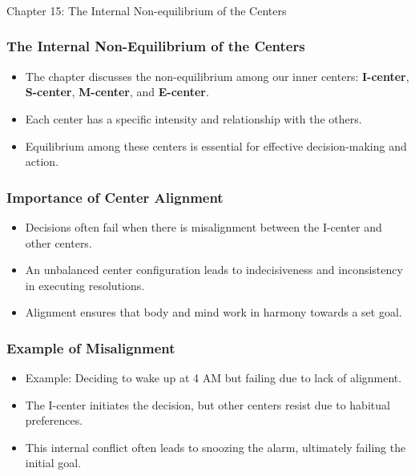 \begin{frame}[fragile]\frametitle{}
\begin{center}
{\Large Chapter 15: The Internal Non-equilibrium of the Centers  }
\end{center}
\end{frame}

\begin{frame}[fragile]\frametitle{The Internal Non-Equilibrium of the Centers}
    \begin{itemize}
        \item The chapter discusses the non-equilibrium among our inner centers: \textbf{I-center}, \textbf{S-center}, \textbf{M-center}, and \textbf{E-center}.
        \item Each center has a specific intensity and relationship with the others.
        \item Equilibrium among these centers is essential for effective decision-making and action.
    \end{itemize}
\end{frame}

\begin{frame}[fragile]\frametitle{Importance of Center Alignment}
    \begin{itemize}
        \item Decisions often fail when there is misalignment between the I-center and other centers.
        \item An unbalanced center configuration leads to indecisiveness and inconsistency in executing resolutions.
        \item Alignment ensures that body and mind work in harmony towards a set goal.
    \end{itemize}
\end{frame}

\begin{frame}[fragile]\frametitle{Example of Misalignment}
    \begin{itemize}
        \item Example: Deciding to wake up at 4 AM but failing due to lack of alignment.
        \item The I-center initiates the decision, but other centers resist due to habitual preferences.
        \item This internal conflict often leads to snoozing the alarm, ultimately failing the initial goal.
    \end{itemize}
\end{frame}

